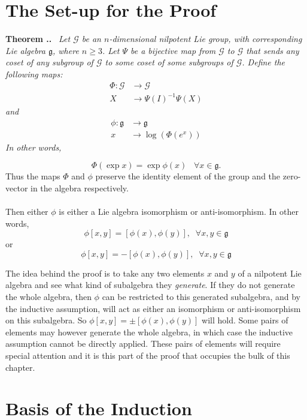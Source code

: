 \documentclass[honours]{UNSWthesis}
\newcommand{\G}{\mathcal{G}}
\newcommand{\g}{\mathfrak{g}}
\newcommand{\1}{\mathbf{e}_{1}}
\newcommand{\2}{\mathbf{e}_{3}}
\newcommand{\3}{\mathbf{e}_{3}}
\newcounter{Item}[section]
\newenvironment{Theorem}{\medskip
                            \refstepcounter{Item}
                            \noindent
                           {\bf Theorem \thesection.\theItem.}\ %
                            \begingroup \sl}
                           {\endgroup\medskip}
\begin{document}
\section{The Set-up for the Proof}
\begin{Theorem}\label{BigTheorem}
Let $\G$ be an $n$-dimensional nilpotent Lie group, with corresponding Lie algebra $\g$, where $n \geq 3$. Let $\Psi$ be a bijective map from $\G$ to $\G$ that sends any coset of any subgroup of $\G$ to some coset of some subgroups of $\G$.  Define the following maps: 
\begin{align*}
\Phi: \G &\longrightarrow \G \\
X & \longrightarrow \Psi(I)^{-1} \Psi(X)
\end{align*}
and 
\begin{align*}
\phi: \g &\longrightarrow \g \\
x & \longrightarrow \log(\Phi(e^{x}))
\end{align*}
In other words, 

\[
\Phi(\exp{x})=\exp{\phi(x)} \;\;\; \forall x \in \g.
\]
Thus the maps $\Phi$ and $\phi$ preserve the identity element of the group and the zero-vector in the algebra respectively. \\
\\ Then either $\phi$ is either a Lie algebra isomorphism or anti-isomorphism. In other words, 
\[
\phi[x,y]= [\phi(x),\phi(y)], \;\;\forall x,y \in \g
\]
or
\[
\phi[x,y]= -[\phi(x),\phi(y)], \;\;\forall x,y \in \g
\]
\end{Theorem}

The idea behind the proof is to take any two elements $x$ and $y$ of a nilpotent Lie algebra and see what kind of subalgebra they \emph{generate}. 
If they do not generate the whole algebra, then $\phi$ can be restricted to this generated subalgebra, and by the inductive assumption, will act as either an isomorphism or anti-isomorphism on this subalgebra. So $\phi[x,y]=\pm[\phi(x),\phi(y)]$ will hold. Some pairs of elements may however generate the whole algebra, in which case the inductive assumption cannot be directly applied. These pairs of elements will require special attention and it is this part of the proof that occupies the bulk of this chapter. 

\section{Basis of the Induction}
\end{document}
